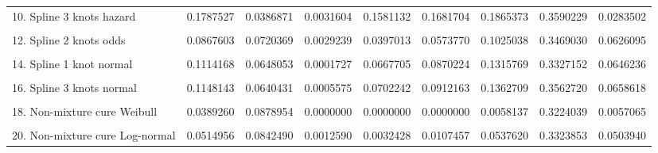 \documentclass[]{article}
\begin{document}
\begin{table}
{\begin{tabular}[t]{lrrrrrrrr}
10. Spline 3 knots hazard & 0.1787527 & 0.0386871 & 0.0031604 & 0.1581132 & 0.1681704 & 0.1865373 & 0.3590229 & 0.0283502\\
\cellcolor{gray!6}{11. Spline 1 knot odds} & \cellcolor{gray!6}{0.0828358} & \cellcolor{gray!6}{0.0722684} & \cellcolor{gray!6}{0.0040186} & \cellcolor{gray!6}{0.0370407} & \cellcolor{gray!6}{0.0534928} & \cellcolor{gray!6}{0.0956147} & \cellcolor{gray!6}{0.3493116} & \cellcolor{gray!6}{0.0583932}\\
12. Spline 2 knots odds & 0.0867603 & 0.0720369 & 0.0029239 & 0.0397013 & 0.0573770 & 0.1025038 & 0.3469030 & 0.0626095\\
\cellcolor{gray!6}{13. Spline 3 knots odds} & \cellcolor{gray!6}{0.0933644} & \cellcolor{gray!6}{0.0716684} & \cellcolor{gray!6}{0.0031346} & \cellcolor{gray!6}{0.0443526} & \cellcolor{gray!6}{0.0641665} & \cellcolor{gray!6}{0.1145082} & \cellcolor{gray!6}{0.3547245} & \cellcolor{gray!6}{0.0699417}\\
14. Spline 1 knot normal & 0.1114168 & 0.0648053 & 0.0001727 & 0.0667705 & 0.0870224 & 0.1315769 & 0.3327152 & 0.0646236\\
\cellcolor{gray!6}{15. Spline 2 knots normal} & \cellcolor{gray!6}{0.1011547} & \cellcolor{gray!6}{0.0666094} & \cellcolor{gray!6}{0.0003302} & \cellcolor{gray!6}{0.0575542} & \cellcolor{gray!6}{0.0758377} & \cellcolor{gray!6}{0.1164719} & \cellcolor{gray!6}{0.3361441} & \cellcolor{gray!6}{0.0587484}\\
16. Spline 3 knots normal & 0.1148143 & 0.0640431 & 0.0005575 & 0.0702242 & 0.0912163 & 0.1362709 & 0.3562720 & 0.0658618\\
\cellcolor{gray!6}{17. Mixture cure Weibull} & \cellcolor{gray!6}{0.0374953} & \cellcolor{gray!6}{0.0871122} & \cellcolor{gray!6}{0.0000000} & \cellcolor{gray!6}{0.0000000} & \cellcolor{gray!6}{0.0000000} & \cellcolor{gray!6}{0.0019526} & \cellcolor{gray!6}{0.3124571} & \cellcolor{gray!6}{0.0019062}\\
18. Non-mixture cure Weibull & 0.0389260 & 0.0878954 & 0.0000000 & 0.0000000 & 0.0000000 & 0.0058137 & 0.3224039 & 0.0057065\\
\cellcolor{gray!6}{19. Mixture cure Log-normal} & \cellcolor{gray!6}{0.0496395} & \cellcolor{gray!6}{0.0871508} & \cellcolor{gray!6}{0.0002039} & \cellcolor{gray!6}{0.0008353} & \cellcolor{gray!6}{0.0048810} & \cellcolor{gray!6}{0.0495432} & \cellcolor{gray!6}{0.3220204} & \cellcolor{gray!6}{0.0484359}\\
20. Non-mixture cure Log-normal & 0.0514956 & 0.0842490 & 0.0012590 & 0.0032428 & 0.0107457 & 0.0537620 & 0.3323853 & 0.0503940\\

\end{tabular}}
\end{table}
\end{document}
